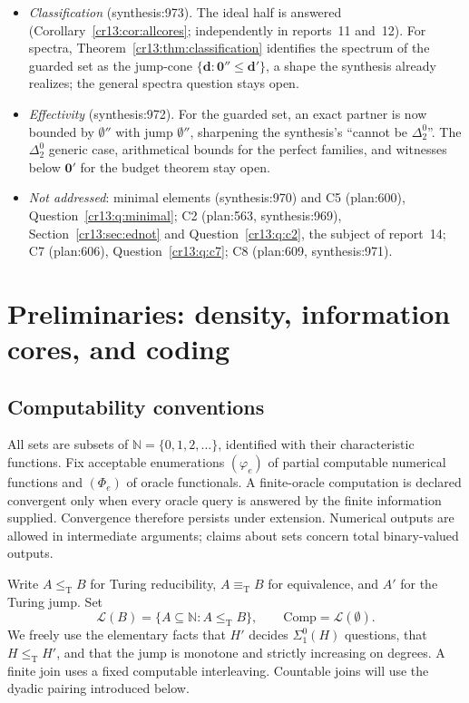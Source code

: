 \documentclass[11pt,letterpaper]{article}
\theoremstyle{definition}
\theoremstyle{remark}\newtheorem{remark}[theorem]{Remark}
\numberwithin{equation}{section}
\newcommand{\N}{\mathbb N}
\newcommand{\leT}{\leq_{\mathrm T}}
\newcommand{\eqT}{\equiv_{\mathrm T}}
\newcommand{\Low}{\mathcal L}
\newcommand{\Comp}{\mathrm{Comp}}
\newcommand{\zero}{\mathbf 0}
\begin{document}
\begin{itemize}
\item \emph{Classification} (synthesis:973). The ideal half is answered (Corollary~\ref{cr13:cor:allcores}; independently in reports~11 and~12). For spectra, Theorem~\ref{cr13:thm:classification} identifies the spectrum of the guarded set as the jump-cone $\{\mathbf d:\zero''\le\mathbf d'\}$, a shape the synthesis already realizes; the general spectra question stays open.
\item \emph{Effectivity} (synthesis:972). For the guarded set, an exact partner is now bounded by $\emptyset''$ with jump $\emptyset''$, sharpening the synthesis's ``cannot be $\Delta^0_2$''. The $\Delta^0_2$ generic case, arithmetical bounds for the perfect families, and witnesses below $\zero'$ for the budget theorem stay open.
\item \emph{Not addressed}: minimal elements (synthesis:970) and C5 (plan:600), Question~\ref{cr13:q:minimal}; C2 (plan:563, synthesis:969), Section~\ref{cr13:sec:ednot} and Question~\ref{cr13:q:c2}, the subject of report~14; C7 (plan:606), Question~\ref{cr13:q:c7}; C8 (plan:609, synthesis:971).
\end{itemize}

\section{Preliminaries: density, information cores, and coding}
\label{cr13:sec:prelim}
\subsection{Computability conventions}
All sets are subsets of $\N=\{0,1,2,\ldots\}$, identified with their characteristic functions. Fix acceptable enumerations $(\varphi_e)$ of partial computable numerical functions and $(\Phi_e)$ of oracle functionals. A finite-oracle computation is declared convergent only when every oracle query is answered by the finite information supplied. Convergence therefore persists under extension. Numerical outputs are allowed in intermediate arguments; claims about sets concern total binary-valued outputs.

Write $A\leT B$ for Turing reducibility, $A\eqT B$ for equivalence, and $A'$ for the Turing jump. Set
\[
 \Low(B)=\{A\subseteq\N:A\leT B\},\qquad
 \Comp=\Low(\emptyset).
\]
We freely use the elementary facts that $H'$ decides $\Sigma^0_1(H)$ questions, that $H\leT H'$, and that the jump is monotone and strictly increasing on degrees. A finite join uses a fixed computable interleaving. Countable joins will use the dyadic pairing introduced below.
\end{document}
